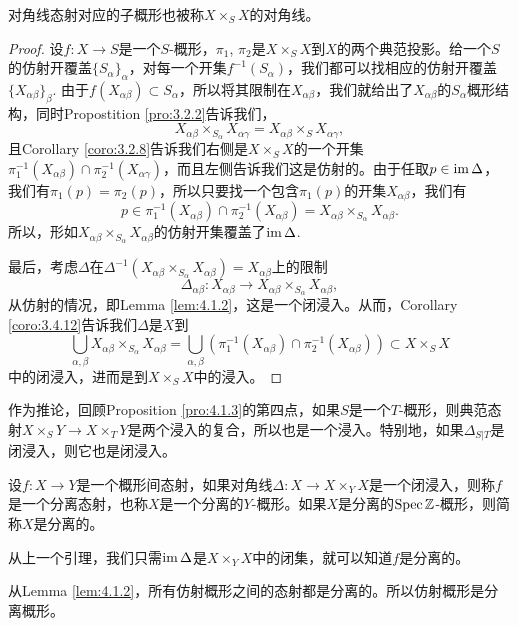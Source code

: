 对角线态射对应的子概形也被称$X\times_S X$的对角线。

\begin{proof}
设$f:X\to S$是一个$S$-概形，$\pi_1$, $\pi_2$是$X\times_S X$到$X$的两个典范投影。给一个$S$的仿射开覆盖$\{S_\alpha\}_\alpha$，对每一个开集$f^{-1}(S_\alpha)$，我们都可以找相应的仿射开覆盖$\{X_{\alpha\beta}\}_\beta$. 由于$f(X_{\alpha\beta})\subset S_{\alpha}$，所以将其限制在$X_{\alpha\beta}$，我们就给出了$X_{\alpha\beta}$的$S_\alpha$概形结构，同时Propostition \ref{pro:3.2.2}告诉我们，
\[
	X_{\alpha\beta}\times_{S_\alpha}X_{\alpha\gamma}=X_{\alpha\beta}\times_{S}X_{\alpha\gamma},
\]
且Corollary \ref{coro:3.2.8}告诉我们右侧是$X\times_S X$的一个开集
$\pi_1^{-1}(X_{\alpha\beta})\cap \pi_2^{-1}(X_{\alpha\gamma})$，而且左侧告诉我们这是仿射的。由于任取$p\in \operatorname{im} \Delta$，我们有$\pi_1(p)=\pi_2(p)$，所以只要找一个包含$\pi_1(p)$的开集$X_{\alpha\beta}$，我们有
\[
p\in \pi_1^{-1}(X_{\alpha\beta})\cap \pi_2^{-1}(X_{\alpha\beta})=X_{\alpha\beta}\times_{S_\alpha}X_{\alpha\beta}.
\]
所以，形如$X_{\alpha\beta}\times_{S_\alpha}X_{\alpha\beta}$的仿射开集覆盖了$\operatorname{im} \Delta$. 

最后，考虑$\Delta$在$\Delta^{-1}(X_{\alpha\beta}\times_{S_\alpha}X_{\alpha\beta})=X_{\alpha\beta}$上的限制
\[
	\Delta_{\alpha\beta}:X_{\alpha\beta}\to X_{\alpha\beta}\times_{S_\alpha}X_{\alpha\beta},
\]
从仿射的情况，即Lemma \ref{lem:4.1.2}，这是一个闭浸入。从而，Corollary \ref{coro:3.4.12}告诉我们$\Delta$是$X$到
\[
\bigcup_{\alpha,\beta}X_{\alpha\beta}\times_{S_\alpha}X_{\alpha\beta}=\bigcup_{\alpha,\beta}\left(\pi_1^{-1}(X_{\alpha\beta})\cap \pi_2^{-1}(X_{\alpha\beta})\right)\subset X\times_S X
\]
中的闭浸入，进而是到$X\times_S X$中的浸入。
\end{proof}

作为推论，回顾Proposition \ref{pro:4.1.3}的第四点，如果$S$是一个$T$-概形，则典范态射$X\times_S Y\to X\times_T Y$是两个浸入的复合，所以也是一个浸入。特别地，如果$\Delta_{S|T}$是闭浸入，则它也是闭浸入。

\begin{para}[分离性]
	设$f:X\to Y$是一个概形间态射，如果对角线$\Delta:X\to X\times_Y X$是一个闭浸入，则称$f$是一个分离态射，也称$X$是一个分离的$Y$-概形。如果$X$是分离的$\operatorname{Spec} \mathbb{Z}$-概形，则简称$X$是分离的。
\end{para}

从上一个引理，我们只需$\operatorname{im} \Delta$是$X\times_Y X$中的闭集，就可以知道$f$是分离的。

从Lemma \ref{lem:4.1.2}，所有仿射概形之间的态射都是分离的。所以仿射概形是分离概形。

